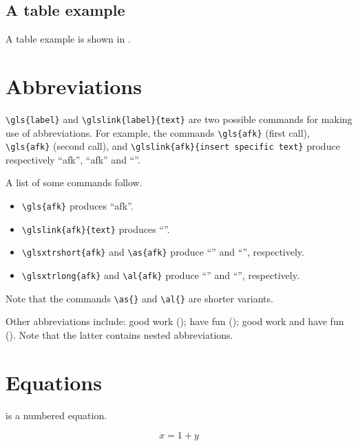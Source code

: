 \subsection{A table example}
\label{c2:ss:a-table-example}

A table example is shown in .




\section{Abbreviations}
\label{c2:s:abbreviations}

\verb+\gls{label}+ and \verb+\glslink{label}{text}+ are two possible commands for making use of abbreviations.
For example, the commands \verb+\gls{afk}+ (first call), \verb+\gls{afk}+ (second call), and \verb+\glslink{afk}{insert specific text}+ produce respectively ``\gls{afk}'', ``\gls{afk}'' and ``''.

A list of some commands follow.

\begin{itemize}
\item
\verb+\gls{afk}+ produces ``\gls{afk}''.
\item
\verb+\glslink{afk}{text}+ produces ``''.
\item
\verb+\glsxtrshort{afk}+ and \verb+\as{afk}+ produce ``'' and ``'', respectively.
\item
\verb+\glsxtrlong{afk}+ and \verb+\al{afk}+ produce ``'' and ``'', respectively.
\end{itemize}

Note that the commands \verb+\as{}+ and \verb+\al{}+ are shorter variants.

Other abbreviations include: good work (); have fun (); good work and have fun ().
Note that the latter contains nested abbreviations.


\section{Equations}
\label{c2:s:equations}

 is a numbered equation.

\begin{equation}
\label{eq:example1}
x = 1 + y
\end{equation}

